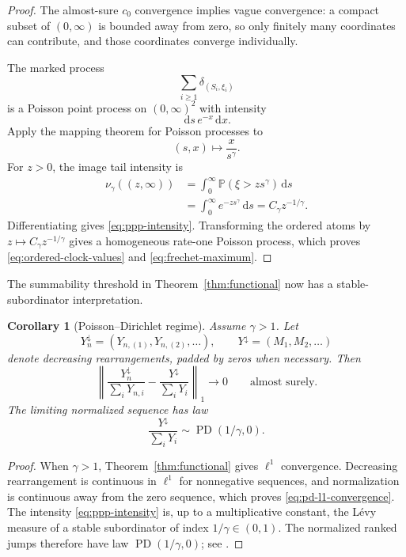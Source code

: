 \documentclass[11pt]{article}
\numberwithin{equation}{section}
\newtheorem{corollary}[theorem]{Corollary}
\theoremstyle{definition}
\theoremstyle{remark}
\newcommand{\Pp}{\mathbb P}
\newcommand{\PD}{\operatorname{PD}}
\newcommand{\dd}{\,\mathrm d}
\begin{document}
\begin{proof}
The almost-sure $c_0$ convergence implies vague convergence: a compact subset of $(0,\infty)$ is bounded away from zero, so only finitely many coordinates can contribute, and those coordinates converge individually.

The marked process
\[
  \sum_{i\geq1}\delta_{(S_i,\xi_i)}
\]
is a Poisson point process on $(0,\infty)^2$ with intensity
\[
  \dd s\,e^{-x}\dd x.
\]
Apply the mapping theorem for Poisson processes \cite[Chapter~15]{Kallenberg} to
\[
  (s,x)\longmapsto \frac{x}{s^\gamma}.
\]
For $z>0$, the image tail intensity is
\begin{align*}
  \nu_\gamma((z,\infty))
  &=\int_0^\infty\Pp(\xi>zs^\gamma)\dd s\\
  &=\int_0^\infty e^{-zs^\gamma}\dd s
  =C_\gamma z^{-1/\gamma}.
\end{align*}
Differentiating gives \eqref{eq:ppp-intensity}.  Transforming the ordered atoms by
$z\mapsto C_\gamma z^{-1/\gamma}$ gives a homogeneous rate-one Poisson process, which proves \eqref{eq:ordered-clock-values} and \eqref{eq:frechet-maximum}.
\end{proof}

The summability threshold in Theorem~\ref{thm:functional} now has a stable-subordinator interpretation.

\begin{corollary}[Poisson--Dirichlet regime]
\label{cor:pd}
Assume $\gamma>1$.  Let
\[
  Y_n^\downarrow=(Y_{n,(1)},Y_{n,(2)},\ldots),
  \qquad
  Y^\downarrow=(M_1,M_2,\ldots)
\]
denote decreasing rearrangements, padded by zeros when necessary.  Then
\begin{equation}
  \left\|
  \frac{Y_n^\downarrow}{\sum_iY_{n,i}}
  -
  \frac{Y^\downarrow}{\sum_iY_i}
  \right\|_1
  \longrightarrow0
  \qquad\text{almost surely}.
  \label{eq:pd-l1-convergence}
\end{equation}
The limiting normalized sequence has law
\begin{equation}
  \frac{Y^\downarrow}{\sum_iY_i}
  \sim\PD(1/\gamma,0).
  \label{eq:pd-law}
\end{equation}
\end{corollary}

\begin{proof}
When $\gamma>1$, Theorem~\ref{thm:functional} gives $\ell^1$ convergence.  Decreasing rearrangement is continuous in $\ell^1$ for nonnegative sequences, and normalization is continuous away from the zero sequence, which proves \eqref{eq:pd-l1-convergence}.  The intensity \eqref{eq:ppp-intensity} is, up to a multiplicative constant, the L\'evy measure of a stable subordinator of index $1/\gamma\in(0,1)$.  The normalized ranked jumps therefore have law $\PD(1/\gamma,0)$; see \cite{PitmanYor}.
\end{proof}
\end{document}
